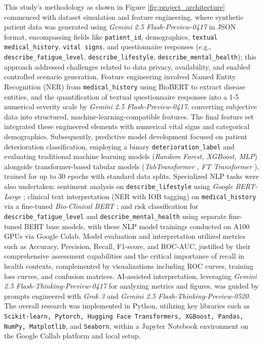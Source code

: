 This study's methodology as shown in Figure \ref{fig:project_architecture} commenced with dataset simulation and feature engineering, where synthetic patient data was generated using \textit{Gemini 2.5 Flash-Preview-0417} \parencite{Doshi_2025} in JSON format, encompassing fields like \texttt{patient\_id}, demographics, \texttt{textual medical\_history}, \texttt{vital signs}, and questionnaire responses (e.g., \texttt{describe\_fatigue\_level}, \texttt{describe\_lifestyle}, \texttt{describe\_mental\_health}); this approach addressed challenges related to data privacy, availability, and enabled controlled scenario generation. Feature engineering involved Named Entity Recognition (NER) from \texttt{medical\_history} using BioBERT \parencite{Lee_2019} to extract disease entities, and the quantification of textual questionnaire responses into a 1-5 numerical severity scale by \textit{Gemini 2.5 Flash-Preview-0417}, converting subjective data into structured, machine-learning-compatible features. The final feature set integrated these engineered elements with numerical vital signs and categorical demographics. Subsequently, predictive model development focused on patient deterioration classification, employing a binary \texttt{deterioration\_label} and evaluating traditional machine learning models (\textit{Random Forest, XGBoost, MLP}) alongside transformer-based tabular models (\textit{TabTransformer} \parencite{huang2020tabtransformertabulardatamodeling}, \textit{FT Transformer} \parencite{gorishniy2023revisitingdeeplearningmodels}), trained for up to 30 epochs with standard data splits. Specialized NLP tasks were also undertaken: sentiment analysis on \texttt{describe\_lifestyle} using \textit{Google BERT-Large} \parencite{devlin2019bertpretrainingdeepbidirectional}; clinical text interpretation (NER with IOB tagging) on \texttt{medical\_history} via a fine-tuned \textit{Bio-Clinical BERT} \parencite{ling2023bioclinicalbertbertbase}; and risk classification for \texttt{describe\_fatigue\_level} and \texttt{describe\_mental\_health} using separate fine-tuned BERT base models, with these NLP model trainings conducted on A100 GPUs via Google Colab. Model evaluation and interpretation utilized metrics such as Accuracy, Precision, Recall, F1-score, and ROC-AUC, justified by their comprehensive assessment capabilities and the critical importance of recall in health contexts, complemented by visualizations including ROC curves, training loss curves, and confusion matrices. AI-assisted interpretation, leveraging \textit{Gemini 2.5 Flash-Thinking-Preview-0417} for analyzing metrics and figures, was guided by prompts engineered with \textit{Grok 3} \parencite{xGrokBeta} and \textit{Gemini 2.5 Flash-Thinking-Preview-0520}. The overall research was implemented in Python, utilizing key libraries such as \texttt{Scikit-learn, Pytorch, Hugging Face Transformers, XGBoost, Pandas, NumPy, Matplotlib}, and \texttt{Seaborn}, within a Jupyter Notebook environment on the Google Collab platform and local setup.